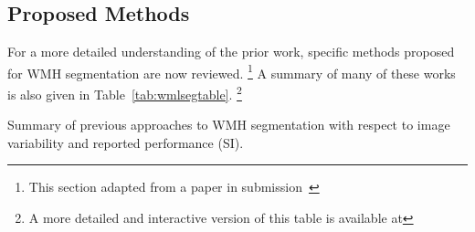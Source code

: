 \subsection{Proposed Methods}\label{ss:prior-proposed}
For a more detailed understanding of the prior work,
specific methods proposed for WMH segmentation are now reviewed.%
\footnote{This section adapted from a paper in submission~\cite{Knight2017a}}
A summary of many of these works is also given in Table~\ref{tab:wmlsegtable}.%
\footnote{A more detailed and interactive version of this table is available at
  }
\begin{table}
  \caption{Summary of previous approaches to WMH segmentation
    with respect to image variability and reported performance (SI).}%
  \label{tab:wmlsegtable}
  \footnotesize{\centering{}}
\end{table}
\newcommand{\priorworksub}[1]{\subsubsection{#1}}

